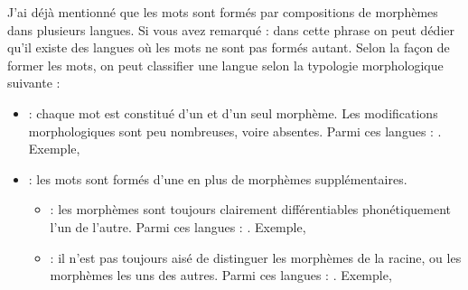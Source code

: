\documentclass{KodeBook}
\begin{document}
J'ai déjà mentionné que les mots sont formés par compositions de morphèmes dans plusieurs langues. 
Si vous avez remarqué : dans cette phrase on peut dédier qu'il existe des langues où les mots ne sont pas formés autant. 
Selon la façon de former les mots, on peut classifier une langue selon la typologie morphologique suivante :
\begin{itemize}
	\item {} : chaque mot est constitué d'un et d'un seul morphème. 
	Les modifications morphologiques sont peu nombreuses, voire absentes. 
	Parmi ces langues : . 
	Exemple, 
	
	\item {} : les mots sont formés d'une  en plus de morphèmes supplémentaires.
	\begin{itemize}
		\item {} : les morphèmes sont toujours clairement différentiables phonétiquement l'un de l'autre. 
		Parmi ces langues : . 
		Exemple,  
		
		\item {} : il n'est pas toujours aisé de distinguer les morphèmes de la racine, ou les morphèmes les uns des autres. 
		Parmi ces langues : .
		Exemple, 
	\end{itemize}
\end{itemize}
\end{document}
